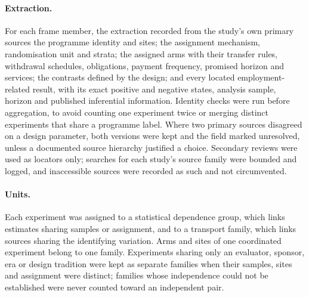 \documentclass[11pt]{article}
\begin{document}
\paragraph{Extraction.} For each frame member, the extraction recorded from the study's own primary sources the programme identity and sites; the assignment mechanism, randomisation unit and strata; the assigned arms with their transfer rules, withdrawal schedules, obligations, payment frequency, promised horizon and services; the contrasts defined by the design; and every located employment-related result, with its exact positive and negative states, analysis sample, horizon and published inferential information. Identity checks were run before aggregation, to avoid counting one experiment twice or merging distinct experiments that share a programme label. Where two primary sources disagreed on a design parameter, both versions were kept and the field marked unresolved, unless a documented source hierarchy justified a choice. Secondary reviews were used as locators only; searches for each study's source family were bounded and logged, and inaccessible sources were recorded as such and not circumvented.

\paragraph{Units.} Each experiment was assigned to a statistical dependence group, which links estimates sharing samples or assignment, and to a transport family, which links sources sharing the identifying variation. Arms and sites of one coordinated experiment belong to one family. Experiments sharing only an evaluator, sponsor, era or design tradition were kept as separate families when their samples, sites and assignment were distinct; families whose independence could not be established were never counted toward an independent pair.
\end{document}
